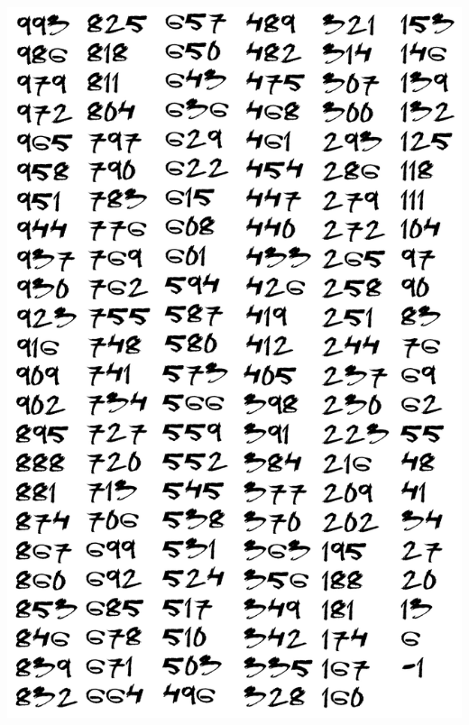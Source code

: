 \begin{enumerate}
    \BgThispage
    \includegraphics[scale=1.2]{img/993}

    \newpage

    \thispagestyle{empty}

    \BgThispage


\end{enumerate}
